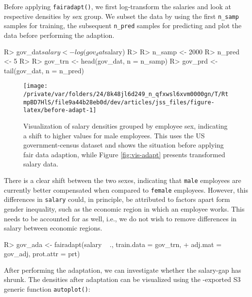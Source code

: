 \documentclass[
  nojss]{jss}
\begin{document}
Before applying \texttt{fairadapt()}, we first log-transform the
salaries and look at respective densities by sex group. We subset the
data by using the first \texttt{n\_samp} samples for training, the
subsequent \texttt{n\_pred} samples for predicting and plot the data
before performing the adaption.

\begin{CodeChunk}
\begin{CodeInput}
R> gov_dat$salary <- log(gov_dat$salary)
R> 
R> n_samp <- 2000
R> n_pred <- 5
R> 
R> gov_trn <- head(gov_dat, n = n_samp)
R> gov_prd <- tail(gov_dat, n = n_pred)
\end{CodeInput}
\end{CodeChunk}

\begin{CodeChunk}
\begin{figure}

{\centering \texttt{[image: /private/var/folders/24/8k48jl6d249\_n\_qfxwsl6xvm0000gn/T/RtmpBD7HlS/file9a44b28eb0d/dev/articles/jss\_files/figure-latex/before-adapt-1]} 

}

\caption{Visualization of salary densities grouped by employee sex, indicating a shift to higher values for male employees. This uses the US government-census dataset and shows the situation before applying fair data adaption, while Figure \ref{fig:vis-adapt} presents transformed salary data.}\label{fig:before-adapt}
\end{figure}
\end{CodeChunk}

There is a clear shift between the two sexes, indicating that
\texttt{male} employees are currently better compensated when compared
to \texttt{female} employees. However, this differences in
\texttt{salary} could, in principle, be attributed to factors apart form
gender inequality, such as the economic region in which an employee
works. This needs to be accounted for as well, i.e., we do not wish to
remove differences in salary between economic regions.

\begin{CodeChunk}
\begin{CodeInput}
R> gov_ada <- fairadapt(salary ~ ., train.data = gov_trn,
+                      adj.mat = gov_adj, prot.attr = prt)
\end{CodeInput}
\end{CodeChunk}

After performing the adaptation, we can investigate whether the
salary-gap has shrunk. The densities after adaptation can be visualized
using the -exported S3 generic function
\texttt{autoplot()}:
\end{document}
